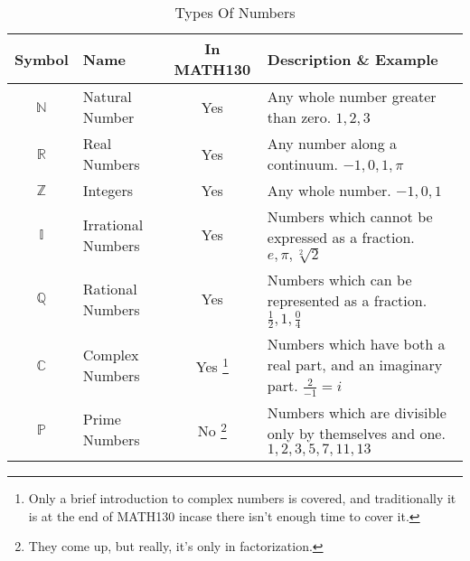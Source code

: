 \begin{table}[!htb]
\label{tab:TypesOfNumbers}
\begin{tabularx}{\linewidth}{| c | l | c | X |} \hline
  Symbol & Name & In MATH130 & Description \& Example \\ \hline \hline
  $\mathbb{N}$ & Natural Number     & Yes & Any whole number greater than
                                            zero. $1, 2, 3 $ \\ \hline
  $\mathbb{R}$ & Real Numbers       & Yes & Any number along a continuum.
                                            $-1, 0, 1, \pi $ \\ \hline
  $\mathbb{Z}$ & Integers           & Yes & Any whole number.
                                            $-1, 0, 1 $ \\ \hline
  $\mathbb{I}$ & Irrational Numbers & Yes & Numbers which cannot be expressed
                                            as a fraction.
                                            $e, \pi, \sqrt[2]{2} $ \\ \hline
  $\mathbb{Q}$ & Rational Numbers   & Yes & Numbers which can be represented as a
                                            fraction.
                                            $ \frac{1}{2}, 1, \frac{0}{4} $
                                            \\ \hline
  $\mathbb{C}$ & Complex Numbers    & Yes \footnote{Only a brief introduction
  to complex numbers is covered, and traditionally it is at the end of MATH130
  incase there isn't enough time to cover it.}
                                            & Numbers which have both a real
                                            part, and an imaginary part.
                                            $ \frac{2}{-1} = i $ \\ \hline
  $\mathbb{P}$ & Prime Numbers      & No \footnote{They come up, but really, it's
 only in factorization.}
                                            & Numbers which are divisible only
                                            by themselves and one.
                                            $1, 2, 3, 5, 7, 11, 13 $ \\  \hline
\end{tabularx}
\caption{Types Of Numbers}
\end{table}

